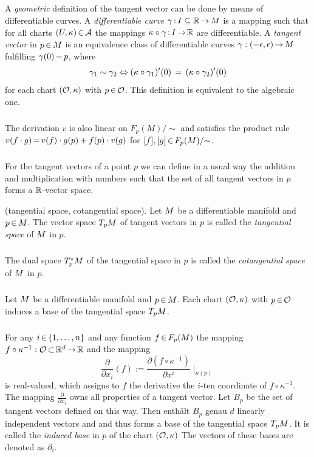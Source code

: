 \documentclass[11pt,twoside]{article}
\begin{document}
\subparagraph{}
A \textit{geometric} definition of the tangent vector can be done
by means of differentiable curves.
A \textit{differentiable curve} $\gamma\:I \subseteq \R \xto \difM$ is a mapping
such that
for all charts $(U,\kappa) \xeof \cal{A}$
the mappings $\kappa \circ \gamma \: I \xto \R$ are differentiable.
A \textit{tangent vector} in $p \xeof \difM$ is an equivalence class
of differentiable curves $\gamma:(-\epsilon,\epsilon) \xto \difM$ fulfilling
$\gamma(0) \eq p$,
where
\[
\gamma_1 \sim \gamma_2 \Leftrightarrow (\kappa \circ \gamma_1)'(0) \=
(\kappa \circ \gamma_2)'(0)
\]
for each chart $(\Off,\kappa)$ with $p \xeof \Off$.
This definition is equivalent to the algebraic one.

\subparagraph{}
The derivation $v$ is also linear on $F_p(M)/{\sim}$
and satisfies the product rule
$v(f \cdot g) \eq v(f) \cdot g(p) + f(p) \cdot v(g)$
for $[f], [g] \xeof F_p(M)/{\sim}$.

\subparagraph{}
For the tangent vectors of a point $p$
we can define in a usual way the addition and multiplication with numbers
such that
the set of all tangent vectors in $p$ forms a $\R$-vector space.

\begin{definition}
(tangential space, cotangential space).
Let $\difM$ be a differentiable manifold and $p \xeof \difM$.
The vector space $T_p \difM$ of tangent vectors in $p$ is called
the \textit{tangential space} of $\difM$ in $p$.

\subparagraph{}
The dual space $T_p^{\*} \difM$ of the tangential space in $p$ is called
the \textit{cotangential space} of $\difM$ in $p$.
\end{definition}

\subparagraph{}
Let $\difM$ be a differentiable manifold and $p \xeof \difM$.
Each chart $(\Off,\kappa)$ with $p \xeof \Off$ induces
a base of the tangential space $T_p \difM$.

\subparagraph{}
For any $i \xeof \{1,\ldots,n\}$
and any function $f \xeof F_p(M)$ the mapping
$f \circ \kappa^{-1}:\Off \xsubset \Rd \xto \R$ and the mapping
\[
\frac{\partial}{\partial x_i}(f) :=
\frac{\partial (f\circ \kappa^{-1})}{\partial x^i} \mid_{\kappa(p)}
\]
is real-valued,
which assigns to $f$ the derivative {\wrt} the $i$-ten coordinate
of $f \circ \kappa^{-1}$.
The mapping $\frac{\partial}{\partial x_i}$ owns all properties
of a tangent vector.
Let $B_p$ be the set of tangent vectors defined on this way.
Then enth\"alt $B_p$ genau $d$ linearly independent vectors and
and thus forms a base of the tangential space $T_p \difM$.
It is called the \textit{induced base} in $p$ of the chart $(\Off,\kappa)$
The vectors of these bases are denoted as $\partial_i$.
\end{document}
